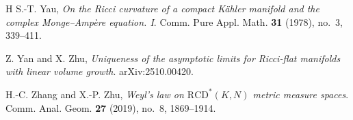 \documentclass[11pt,reqno]{amsart}
\numberwithin{equation}{section}
\theoremstyle{definition}
\theoremstyle{remark}
\begin{document}
\begin{thebibliography}{H}
S.-T. Yau,
\textit{On the Ricci curvature of a compact Kähler manifold and the complex Monge--Ampère equation. I}.
Comm. Pure Appl. Math. \textbf{31} (1978), no.~3, 339--411.

Z. Yan and X. Zhu,
\textit{Uniqueness of the asymptotic limits for Ricci-flat manifolds with linear volume growth}.
arXiv:2510.00420.

H.-C. Zhang and X.-P. Zhu,
\textit{Weyl’s law on $\mathrm{RCD}^\ast(K,N)$ metric measure spaces}.
Comm. Anal. Geom. \textbf{27} (2019), no.~8, 1869--1914.














\end{thebibliography}
\end{document}
